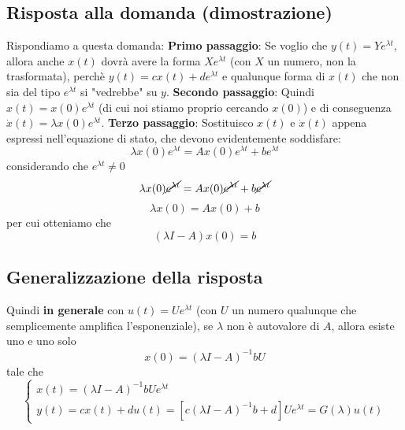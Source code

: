 \subsection{Risposta alla domanda (dimostrazione)}
Rispondiamo a questa domanda:\newline
\textbf{Primo passaggio}:\newline
Se voglio che $y(t) = Y e^{\lambda t}$, allora anche $x(t)$ dovrà avere la forma $X e^{\lambda t}$ (con $X$ un numero, non la trasformata), perchè $y(t) = cx(t) + de^{\lambda t}$ e qualunque forma di $x(t)$ che non sia del tipo $e^{\lambda t}$ si "vedrebbe" su $y$.\newline
\newline
\textbf{Secondo passaggio}:\newline
Quindi $x(t) = x(0) e ^{\lambda t}$ (di cui noi stiamo proprio cercando $x(0)$) e di conseguenza $\dot{x}(t) = \lambda x(0) e^{\lambda t}$.\newline
\newline
\textbf{Terzo passaggio}:\newline
Sostituisco $x(t)$ e $\dot{x}(t)$ appena espressi nell'equazione di stato, che devono evidentemente soddisfare:
\[
    \lambda x(0) e^{\lambda t} = A x(0) e^{\lambda t} + b e^{\lambda t}
\]
considerando che $e^{\lambda t} \neq 0$
\[
    \lambda x(0) \cancel{e^{\lambda t}} = A x(0) \cancel{e^{\lambda t}} + b \cancel{e^{\lambda t}}
\]
\[
    \lambda x(0)  = A x(0)  + b 
\]
per cui otteniamo che
\[
    (\lambda I - A) x(0) = b
\]
\subsection{Generalizzazione della risposta}
Quindi \textbf{in generale} con $u(t) = U e^{\lambda t}$ (con $U$ un numero qualunque che semplicemente amplifica l'esponenziale), se $\lambda$ non è autovalore di $A$, allora esiste uno e uno solo 
\[
    x(0) = (\lambda I - A)^{-1}b U
\] tale che 
\[
    \begin{cases}
        x(t) = (\lambda I -A)^{-1} b U e^{\lambda t}\\
        y(t) = cx(t) + du(t) =  [c(\lambda I -A)^{-1} b + d] U e^{\lambda t} = G(\lambda) u(t)
    \end{cases}
\]

